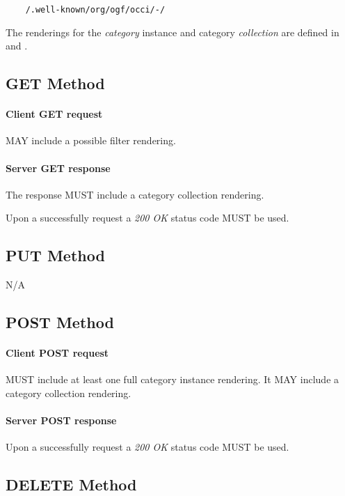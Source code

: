\documentclass[10pt,a4paper]{article}
\begin{document}
\begin{verbatim}
	/.well-known/org/ogf/occi/-/
\end{verbatim}

The renderings for the {\em category} instance and category {\em collection} are defined in \cite{occi:text} and \cite{occi:json}.

\subsection{GET Method}

\paragraph{Client GET request}
MAY include a possible filter rendering.

\paragraph{Server GET response}
The response MUST include a category collection rendering.

Upon a successfully request a \emph{200 OK} status code MUST be used.

\subsection{PUT Method}

N/A

\subsection{POST Method}

\paragraph{Client POST request}
MUST include at least one full category instance rendering. It MAY include a category collection rendering.

\paragraph{Server POST response}
Upon a successfully request a \emph{200 OK} status code MUST be used.

\subsection{DELETE Method}
\end{document}
